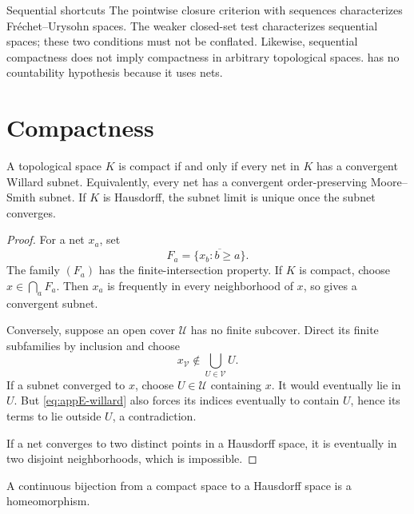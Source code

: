 \begin{warning}{Sequential shortcuts}
\label{warn:appE-sequential-shortcuts}
The pointwise closure criterion with sequences characterizes
Fr\'echet--Urysohn spaces.  The weaker closed-set test characterizes
sequential spaces; these two conditions must not be conflated.
Likewise, sequential compactness does not imply compactness in arbitrary
topological spaces.
 has no countability hypothesis because it
uses nets.
\end{warning}

\section{Compactness}
\label{sec:appE-compactness}

\begin{theorem}\label{thm:appE-net-compactness}
A topological space \(K\) is compact if and only if every net in \(K\) has a
convergent Willard subnet.
Equivalently, every net has a convergent order-preserving Moore--Smith
subnet.
If \(K\) is Hausdorff, the subnet limit is unique once the subnet converges.
\end{theorem}

\begin{proof}
For a net \(x_a\), set
\[
 F_a=\overline{\{x_b:b\geq a\}}.
\]
The family \((F_a)\) has the finite-intersection property.
If \(K\) is compact, choose \(x\in\bigcap_aF_a\).
Then \(x_a\) is frequently in every neighborhood of \(x\), so
 gives a convergent subnet.

Conversely, suppose an open cover \(\mathcal U\) has no finite subcover.
Direct its finite subfamilies by inclusion and choose
\[
 x_{\mathcal V}\notin\bigcup_{U\in\mathcal V}U.
\]
If a subnet converged to \(x\), choose \(U\in\mathcal U\) containing \(x\).
It would eventually lie in \(U\).
But \eqref{eq:appE-willard} also forces its indices eventually to contain
\(U\), hence its terms to lie outside \(U\), a contradiction.

If a net converges to two distinct points in a Hausdorff space, it is
eventually in two disjoint neighborhoods, which is impossible.
\end{proof}

\begin{corollary}\label{cor:appE-compact-Hausdorff}
A continuous bijection from a compact space to a Hausdorff space is a
homeomorphism.
\end{corollary}

